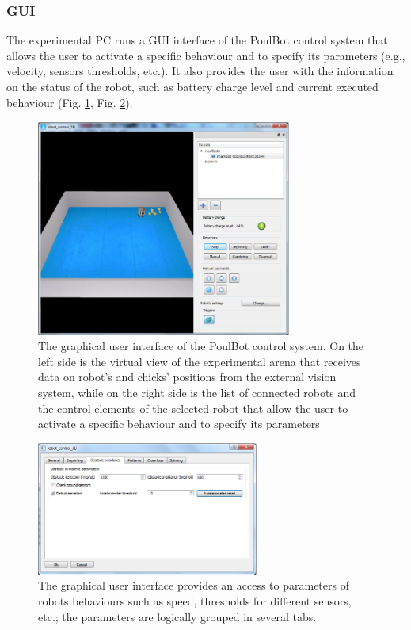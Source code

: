 \documentclass{styles/assisi}
\begin{document}
\subsubsection{GUI}
The experimental PC runs a GUI interface of the PoulBot control system that allows the user to activate a specific behaviour and to specify its parameters (e.g., velocity, sensors thresholds, etc.). It also provides the user with the information on the status of the robot, such as battery charge level and current executed behaviour (Fig. \ref{fig:poulbot_control}, Fig. \ref{fig:poulbot_control_gui_settings}).

\begin{figure}[ht]
\centering
\includegraphics[width=0.75\textwidth]{./figs/poulbot_control_gui.png}
\caption{The graphical user interface of the PoulBot control system. On the left side is the virtual view of the experimental arena that receives data on robot's and chicks' positions from the external vision system, while on the right side is the list of connected robots and the control elements of the selected robot that allow the user to activate a specific  behaviour and to specify its parameters}
\label{fig:poulbot_control}
\end{figure}

\begin{figure}[ht]
\centering
\includegraphics[width=0.65\textwidth]{./figs/poulbot_control_gui_settings.png}
\caption{The graphical user interface provides an access to parameters of robots behaviours such as speed, thresholds for different sensors, etc.; the parameters are logically grouped in several tabs.}
\label{fig:poulbot_control_gui_settings}
\end{figure}
\end{document}

